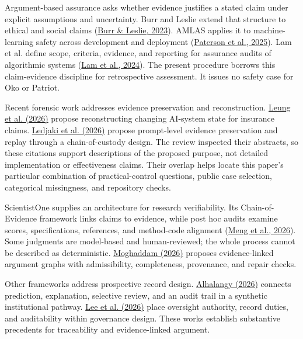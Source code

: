\documentclass[11pt]{article}
\begin{document}
Argument-based assurance asks whether evidence justifies a stated claim under explicit assumptions and uncertainty. Burr and Leslie extend that structure to ethical and social claims (\href{https://doi.org/10.1007/s43681-022-00178-0}{Burr \& Leslie, 2023}). AMLAS applies it to machine-learning safety across development and deployment (\href{https://doi.org/10.1016/j.ress.2025.111311}{Paterson et al., 2025}). Lam et al. define scope, criteria, evidence, and reporting for assurance audits of algorithmic systems (\href{https://doi.org/10.1145/3630106.3658957}{Lam et al., 2024}). The present procedure borrows this claim-evidence discipline for retrospective assessment. It issues no safety case for Oko or Patriot.

Recent forensic work addresses evidence preservation and reconstruction. \href{https://arxiv.org/abs/2606.03777}{Leung et al. (2026)} propose reconstructing changing AI-system state for insurance claims. \href{https://doi.org/10.1145/3774905.3795469}{Ledjaki et al. (2026)} propose prompt-level evidence preservation and replay through a chain-of-custody design. The review inspected their abstracts, so these citations support descriptions of the proposed purpose, not detailed implementation or effectiveness claims. Their overlap helps locate this paper's particular combination of practical-control questions, public case selection, categorical missingness, and repository checks.

ScientistOne supplies an architecture for research verifiability. Its Chain-of-Evidence framework links claims to evidence, while post hoc audits examine scores, specifications, references, and method-code alignment (\href{https://doi.org/10.48550/arXiv.2605.26340}{Meng et al., 2026}). Some judgments are model-based and human-reviewed; the whole process cannot be described as deterministic. \href{https://doi.org/10.48550/arXiv.2604.04103}{Moghaddam (2026)} proposes evidence-linked argument graphs with admissibility, completeness, provenance, and repair checks.

Other frameworks address prospective record design. \href{https://doi.org/10.3390/info17070694}{Alhalangy (2026)} connects prediction, explanation, selective review, and an audit trail in a synthetic institutional pathway. \href{https://doi.org/10.3390/systems14070849}{Lee et al. (2026)} place oversight authority, record duties, and auditability within governance design. These works establish substantive precedents for traceability and evidence-linked argument.
\end{document}
